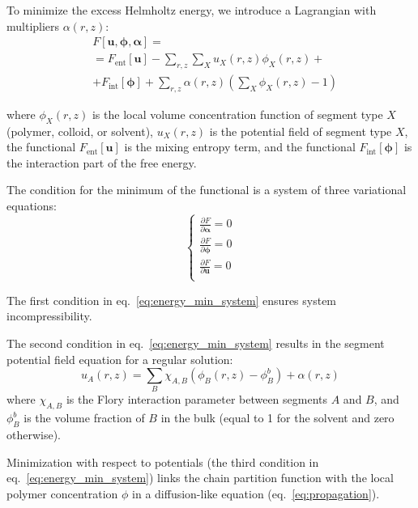\documentclass[10pt, a4paper]{article}
\begin{document}
\begin{multicols}{2}
To minimize the excess Helmholtz energy, we introduce a Lagrangian with multipliers $\alpha(r, z)$:
\begin{equation}
    \label{eq:fe_lagrangian}
    \begin{aligned}
        &F[\mathbf{u}, \boldsymbol{\phi}, \boldsymbol{\alpha}] =\\
        &= F_{\text{ent}}[\mathbf{u}] - \sum\limits_{r,z} \sum\limits_X u_X(r, z) \phi_X(r, z) + \\
        &+ F_{\text{int}} [\boldsymbol{\phi}] 
        + \sum\limits_{r,z} \alpha(r, z) \left( \sum\limits_X \phi_X(r, z) - 1 \right)
    \end{aligned} 
\end{equation}

where $\phi_X(r, z)$ is the local volume concentration function of segment type $X$ (polymer, colloid, or solvent), $u_X(r, z)$ is the potential field of segment type $X$, the functional $F_{\text{ent}}[\mathbf{u}]$ is the mixing entropy term, and the functional $F_{\text{int}} [\boldsymbol{\phi}]$ is the interaction part of the free energy.

The condition for the minimum of the functional is a system of three variational equations:
\begin{equation}
    \label{eq:energy_min_system}
    \begin{cases}
        \frac{\partial F}{\partial \boldsymbol{\alpha}} = 0 \\
        \frac{\partial F}{\partial \boldsymbol{\phi}} = 0 \\
        \frac{\partial F}{\partial \mathbf{u}} = 0 \\
    \end{cases}
\end{equation}

The first condition in eq.~\ref{eq:energy_min_system} ensures system incompressibility.

The second condition in eq.~\ref{eq:energy_min_system} results in the segment potential field equation for a regular solution:
\begin{equation}
    \label{eq:u-phi}
    u_A(r, z) =\sum\limits_{B} \chi_{A,B} \left(\phi_B(r,z) - \phi_B^b \right) + \alpha(r, z)
\end{equation}
where $\chi_{A,B}$ is the Flory interaction parameter between segments $A$ and $B$, and $\phi_B^b$ is the volume fraction of $B$ in the bulk (equal to 1 for the solvent and zero otherwise).

Minimization with respect to potentials (the third condition in eq.~\ref{eq:energy_min_system}) links the chain partition function with the local polymer concentration $\phi$ in a diffusion-like equation (eq.~\ref{eq:propagation}).


\end{multicols}
\end{document}
